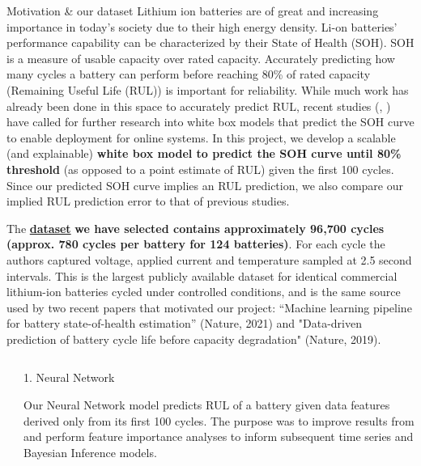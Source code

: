 \documentclass[final]{beamer}
\newlength{\sepwidth}
\newlength{\colwidth}
\newcommand{\separatorcolumn}{\begin{column}{\sepwidth}\end{column}}
\begin{document}
\begin{frame}[t]
\vfill
\begin{block}{\large Motivation \& our dataset}
Lithium ion batteries are of great and increasing importance in today’s society due to their high energy density. Li-on batteries’ performance capability can be characterized by their State of Health (SOH). SOH is a measure of usable capacity over rated capacity. Accurately predicting how many cycles a battery can perform before reaching 80\% of rated capacity (Remaining Useful Life (RUL)) is important for reliability. While much work has already been done in this space to accurately predict RUL, recent studies (\cite{energiesMdpi}, \cite{DariusOld})  have called for further research into white box models that predict the SOH curve to enable deployment for online systems.    
In this project, we develop a scalable (and explainable) \textbf{white box model to predict the SOH curve until 80\% threshold} (as opposed to a point estimate of RUL) given the first 100 cycles. Since our predicted SOH curve implies an RUL prediction, we also compare our implied RUL prediction error to that of previous studies.
\newline

The \href{https://data.matr.io/1/projects/5c48dd2bc625d700019f3204}{\textbf{dataset}} \textbf{we have selected contains approximately 96,700 cycles (approx. 780 cycles per battery for 124 batteries)}. For each cycle the authors captured voltage, applied current and temperature sampled at 2.5 second intervals. This is the largest publicly available dataset for identical commercial lithium-ion batteries cycled under controlled conditions, and is the same source used by two recent papers that motivated our project: “Machine learning pipeline for battery state-of-health estimation” (Nature, 2021)\cite{roman2021machine} and "Data-driven prediction of battery cycle life before capacity degradation" (Nature, 2019)\cite{severson2019data}.
\end{block}

\begin{columns}[t]
\separatorcolumn

\begin{column}{\colwidth}

  \begin{block}{1. Neural Network}
            
Our Neural Network model predicts RUL of a battery given data features derived only from its first 100 cycles. The purpose was
to improve results from \cite{severson2019data} and perform feature importance analyses to inform subsequent time series and Bayesian Inference
models.


\end{block}
\end{column}
\end{columns}
\end{frame}
\end{document}
